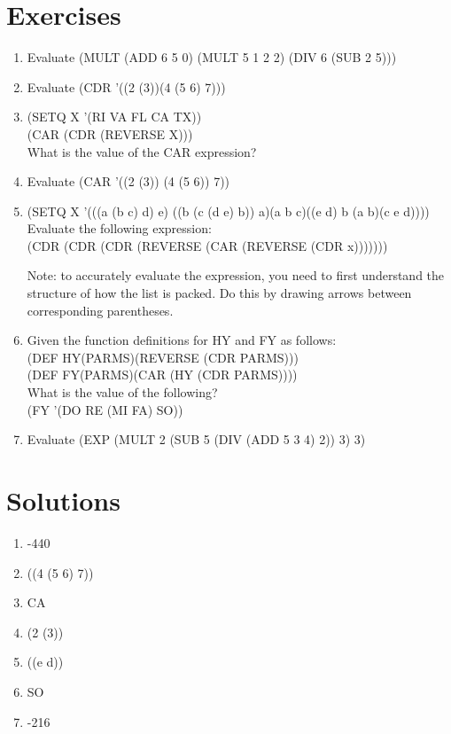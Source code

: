 \documentclass[11pt,letterpaper]{article}
\begin{document}
    \newpage
    \section{Exercises}
    \begin{enumerate}
        \item Evaluate (MULT (ADD 6 5 0) (MULT 5 1 2 2) (DIV 6 (SUB 2 5)))
        \item Evaluate (CDR '((2 (3))(4 (5 6) 7)))
        \item (SETQ X '(RI VA FL CA TX))\\
        (CAR (CDR (REVERSE X)))\\
        What is the value of the CAR expression?
        \item Evaluate (CAR '((2 (3)) (4 (5 6)) 7))
        \item (SETQ X '(((a (b c) d) e) ((b (c (d e) b)) a)(a b c)((e d) b (a b)(c e d))))\\
        Evaluate the following expression:\\
        (CDR (CDR (CDR (REVERSE (CAR (REVERSE (CDR x)))))))

        Note: to accurately evaluate the expression,
        you need to first understand the structure
        of how the list is packed.
        Do this by drawing arrows between corresponding parentheses.

        \item Given the function definitions for HY and FY as follows:\\
        (DEF HY(PARMS)(REVERSE (CDR PARMS)))\\
        (DEF FY(PARMS)(CAR (HY (CDR PARMS))))\\
        What is the value of the following?\\
        (FY '(DO RE (MI FA) SO))
        \item Evaluate
        (EXP (MULT 2 (SUB 5 (DIV (ADD 5 3 4) 2)) 3) 3)
    \end{enumerate}

    \newpage
    \section{Solutions}
    \begin{enumerate}
        \item -440
        \item ((4 (5 6) 7))
        \item CA
        \item (2 (3))
        \item ((e d))
        \item SO
        \item -216
    \end{enumerate}
\end{document}
